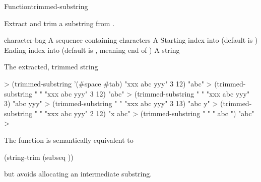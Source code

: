 \documentclass[10pt,twoside,english,pdftex]{article}
\begin{document}
\begin{functiondoc}{Function}{trimmed-substring}%
  {
    }
% 

\fnsyntax

\fnpurpose Extract and trim a substring from .

\fnpackage {}

\fnmodule {}

\fnargs
\begin{args}{character-bag}
 A sequence containing characters
\arg[string] A 
\arg[start] Starting index into  (default is )
\arg[end] Ending index into  (default is \nil, meaning
end of )
 A string
\end{args}

\fnreturns The extracted, trimmed string

\fnexamples
%
\W\supp
\begin{example}
  > (trimmed-substring '(#\bkslash{}space #\bkslash{}tab) "xxx   abc   yyy" 3 12)
  "abc"
  > (trimmed-substring " " "xxx   abc   yyy" 3 12)
  "abc"\goodpagebreak
  > (trimmed-substring " " "xxx   abc   yyy" 3)
  "abc   yyy"\goodpagebreak
  > (trimmed-substring " " "xxx   abc   yyy" 3 13)
  "abc   y"
  > (trimmed-substring " " "xxx   abc   yyy" 2 12)
  "x   abc"
  > (trimmed-substring " " "   abc   ")
  "abc"
  >
\end{example}

\fnnote The function  is semantically
equivalent to
%
\W\supp
\begin{example}
  (string-trim  (subseq ))
\end{example} 
%
but avoids allocating an intermediate substring.

\end{functiondoc}

\end{document}
